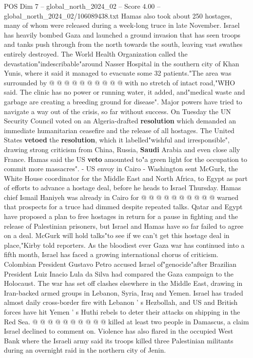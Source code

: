 \begin{textsample}{POS Dim 7 – global\_north\_2024\_02 – Score 4.00 – global\_north\_2024\_02/106089438.txt}
Hamas also took about 250 hostages, many of whom were released during a week-long truce in late November.
Israel has heavily bombed Gaza and launched a ground invasion that has seen troops and tanks push through from the north towards the south, leaving vast swathes entirely destroyed.
The World Health Organization called the devastation"indescribable"around Nasser Hospital in the southern city of Khan Yunis, where it said it managed to evacuate some 32 patients."The area was surrounded by @ @ @ @ @ @ @ @ @ @ with no stretch of intact road,"WHO said.
The clinic has no power or running water, it added, and"medical waste and garbage are creating a breeding ground for disease".
Major powers have tried to navigate a way out of the crisis, so far without success.
On Tuesday the UN Security Council voted on an Algeria-drafted \textbf{resolution} which demanded an immediate humanitarian ceasefire and the release of all hostages.
The United States \textbf{vetoed} the \textbf{resolution}, which it labelled"wishful and irresponsible", drawing strong criticism from China, Russia, \textbf{Saudi} Arabia and even close ally France.
Hamas said the US \textbf{veto} amounted to"a green light for the occupation to commit more massacres". - US envoy in Cairo - Washington sent McGurk, the White House coordinator for the Middle East and North Africa, to Egypt as part of efforts to advance a hostage deal, before he heads to Israel Thursday.
Hamas chief Ismail Haniyeh was already in Cairo for @ @ @ @ @ @ @ @ @ @ warned that prospects for a truce had dimmed despite repeated talks.
Qatar and Egypt have proposed a plan to free hostages in return for a pause in fighting and the release of Palestinian prisoners, but Israel and Hamas have so far failed to agree on a deal.
McGurk will hold talks"to see if we can't get this hostage deal in place,"Kirby told reporters.
As the bloodiest ever Gaza war has continued into a fifth month, Israel has faced a growing international chorus of criticism.
Colombian President Gustavo Petro accused Israel of"genocide"after Brazilian President Luiz Inacio Lula da Silva had compared the Gaza campaign to the Holocaust.
The war has set off clashes elsewhere in the Middle East, drawing in Iran-backed armed groups in Lebanon, Syria, Iraq and Yemen.
Israel has traded almost daily cross-border fire with Lebanon ' s Hezbollah, and US and British forces have hit Yemen ' s Huthi rebels to deter their attacks on shipping in the Red Sea. @ @ @ @ @ @ @ @ @ @ killed at least two people in Damascus, a claim Israel declined to comment on.
Violence has also flared in the occupied West Bank where the Israeli army said its troops killed three Palestinian militants during an overnight raid in the northern city of Jenin.

\end{textsample}
